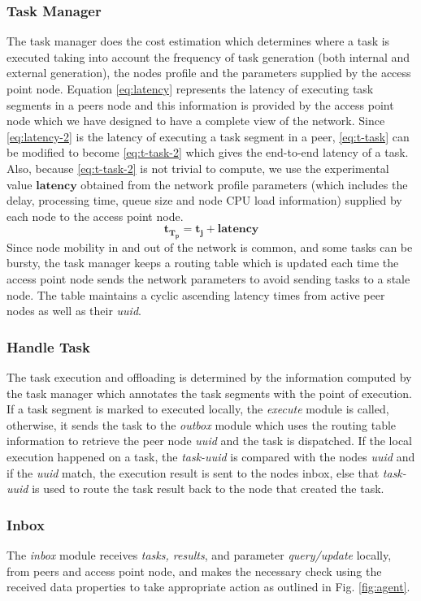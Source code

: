 \subsubsection{Task Manager}
The task manager does the cost estimation which determines 
where a task is executed taking into account the frequency of 
task generation (both internal and external generation), the 
nodes profile and the parameters supplied by the access 
point node. Equation \eqref{eq:latency} represents the 
latency of executing task segments in a peers node and 
this information is provided by the access point node which 
we have designed to have a complete view of the network. 
Since \eqref{eq:latency-2} is the latency of executing a task 
segment in a peer, \eqref{eq:t-task} can be modified to 
become \eqref{eq:t-task-2} which gives the end-to-end latency 
of a task. Also, because \eqref{eq:t-task-2} is not trivial 
to compute, we use the experimental value $ 
\bm{\text{latency}} $ obtained from the network profile 
parameters (which includes the delay, processing time, queue 
size and node CPU load information) supplied by each node to 
the access point node.
\begin{equation}
	\bm{t_{T_p}= t_j + \text{latency} }
	\label{eq:t-task-2}
\end{equation}
Since node mobility in and out of the network is 
common, and some tasks can be bursty, the task manager keeps 
a routing table which is updated each time the access point 
node sends the network parameters to avoid sending tasks to a 
stale node. The table maintains a cyclic ascending 
latency times from active peer nodes as well as their 
\emph{uuid}.
\subsubsection{Handle Task}
The task execution and offloading is determined by the 
information computed by the task manager which annotates the 
task segments with the point of execution. If a task segment 
is marked to executed locally, the \emph{execute} module is 
called, otherwise, it sends the task to the \emph{outbox} 
module which uses the routing table information to retrieve 
the peer node \emph{uuid} and the task is dispatched. If the 
local execution happened on a task, the \emph{task-uuid} is 
compared with the nodes \emph{uuid} and if the 
\emph{uuid} match, the execution result is sent to the 
nodes inbox, else that \emph{task-uuid} is used to route the 
task result back to the node that created the task.
\subsubsection{Inbox}
The \emph{inbox} module receives \emph{tasks, results}, and 
parameter \emph{query/update} locally, from peers 
and access point node, and makes the necessary check using 
the 
received data properties to take appropriate action as 
outlined in Fig. \ref{fig:agent}. 
